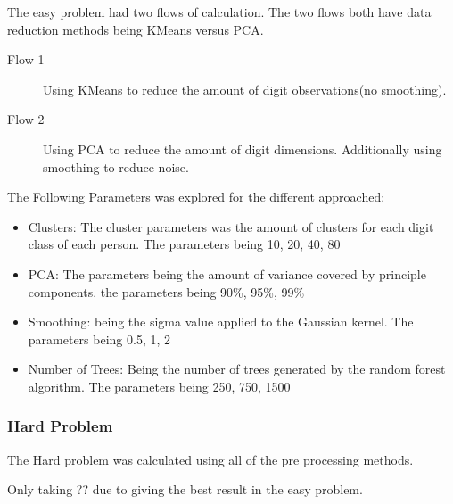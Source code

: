 \documentclass[report]{subfiles}
\begin{document}
The easy problem had two flows of calculation. The two flows both have data reduction methods being KMeans versus PCA.

\begin{description}
\item[Flow 1] Using KMeans to reduce the amount of digit observations(no smoothing).
\item[Flow 2] Using PCA to reduce the amount of digit dimensions. Additionally using smoothing to reduce noise.
\end{description}

The Following Parameters was explored for the different approached:
\begin{itemize}
\item Clusters: The cluster parameters was the amount of clusters for each digit class of each person. The parameters being {10, 20, 40, 80}
\item PCA: The parameters being the amount of variance covered by principle components. the parameters being {90\%, 95\%, 99\%}
\item Smoothing: being the sigma value applied to the Gaussian kernel. The parameters being {0.5, 1, 2}
\item Number of Trees: Being the number of trees generated by the random forest algorithm. The parameters being {250, 750, 1500}
\end{itemize}

\subsubsection{Hard Problem}
The Hard problem was calculated using all of the pre processing methods.

Only taking ?? due to giving the best result in the easy problem.
\end{document}
